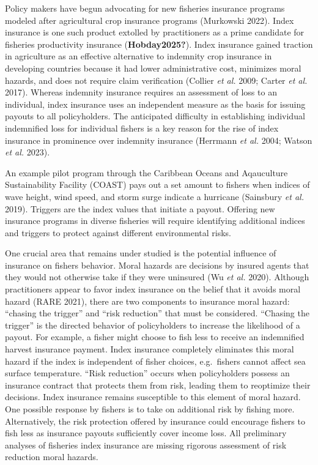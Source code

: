 \documentclass[
  letterpaper,
  DIV=11,
  numbers=noendperiod]{scrartcl}
\theoremstyle{plain}
\theoremstyle{plain}
\theoremstyle{remark}
\begin{document}
Policy makers have begun advocating for new fisheries insurance programs
modeled after agricultural crop insurance programs (Murkowski 2022).
Index insurance is one such product extolled by practitioners as a prime
candidate for fisheries productivity insurance (\textbf{Hobday2025?}).
Index insurance gained traction in agriculture as an effective
alternative to indemnity crop insurance in developing countries because
it had lower administrative cost, minimizes moral hazards, and does not
require claim verification (Collier \emph{et al.} 2009; Carter \emph{et
al.} 2017). Whereas indemnity insurance requires an assessment of loss
to an individual, index insurance uses an independent measure as the
basis for issuing payouts to all policyholders. The anticipated
difficulty in establishing individual indemnified loss for individual
fishers is a key reason for the rise of index insurance in prominence
over indemnity insurance (Herrmann \emph{et al.} 2004; Watson \emph{et
al.} 2023).

An example pilot program through the Caribbean Oceans and Aqauculture
Sustainability Facility (COAST) pays out a set amount to fishers when
indices of wave height, wind speed, and storm surge indicate a hurricane
(Sainsbury \emph{et al.} 2019). Triggers are the index values that
initiate a payout. Offering new insurance programs in diverse fisheries
will require identifying additional indices and triggers to protect
against different environmental risks.

One crucial area that remains under studied is the potential influence
of insurance on fishers behavior. Moral hazards are decisions by insured
agents that they would not otherwise take if they were uninsured (Wu
\emph{et al.} 2020). Although practitioners appear to favor index
insurance on the belief that it avoids moral hazard (RARE 2021), there
are two components to insurance moral hazard: ``chasing the trigger''
and ``risk reduction'' that must be considered. ``Chasing the trigger''
is the directed behavior of policyholders to increase the likelihood of
a payout. For example, a fisher might choose to fish less to receive an
indemnified harvest insurance payment. Index insurance completely
eliminates this moral hazard if the index is independent of fisher
choices, e.g.~fishers cannot affect sea surface temperature. ``Risk
reduction'' occurs when policyholders possess an insurance contract that
protects them from risk, leading them to reoptimize their decisions.
Index insurance remains susceptible to this element of moral hazard. One
possible response by fishers is to take on additional risk by fishing
more. Alternatively, the risk protection offered by insurance could
encourage fishers to fish less as insurance payouts sufficiently cover
income loss. All preliminary analyses of fisheries index insurance are
missing rigorous assessment of risk reduction moral hazards.
\end{document}
